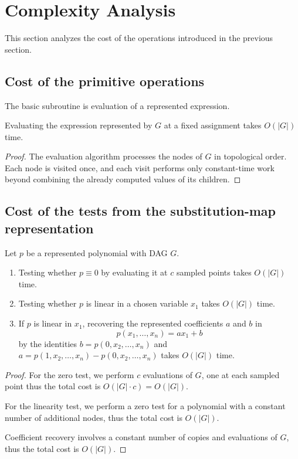 \section*{Complexity Analysis}

This section analyzes the cost of the operations introduced in the previous section.

\subsection*{Cost of the primitive operations}

The basic subroutine is evaluation of a represented expression.

\begin{lemma}
  Evaluating the expression represented by $G$ at a fixed assignment takes $O(|G|)$ time.
\end{lemma}
\begin{proof}
  The evaluation algorithm processes the nodes of $G$ in topological order.
  Each node is visited once, and each visit performs only constant-time work beyond combining the already computed values of its children.
\end{proof}

\subsection*{Cost of the tests from the substitution-map representation}

\begin{lemma}
  Let $p$ be a represented polynomial with DAG $G$.
  \begin{enumerate}
    \item Testing whether $p \equiv 0$ by evaluating it at $c$ sampled points takes $O(|G|)$ time.
    \item Testing whether $p$ is linear in a chosen variable $x_1$ takes $O(|G|)$ time.
    \item If $p$ is linear in $x_1$, recovering the represented coefficients $a$ and $b$ in
      \[
        p(x_1,\dots,x_n) = a x_1 + b
      \]
      by the identities $b = p(0,x_2,\dots,x_n)$ and $a = p(1,x_2,\dots,x_n) - p(0,x_2,\dots,x_n)$ takes $O(|G|)$ time.
  \end{enumerate}
\end{lemma}
\begin{proof}
  For the zero test, we perform $c$ evaluations of $G$, one at each sampled point thus the total cost is $O(|G| \cdot c) = O(|G|)$.

  For the linearity test, we perform a zero test for a polynomial with a constant number of additional nodes, thus the total cost is $O(|G|)$.

  Coefficient recovery involves a constant number of copies and evaluations of $G$, thus the total cost is $O(|G|)$.
\end{proof}

